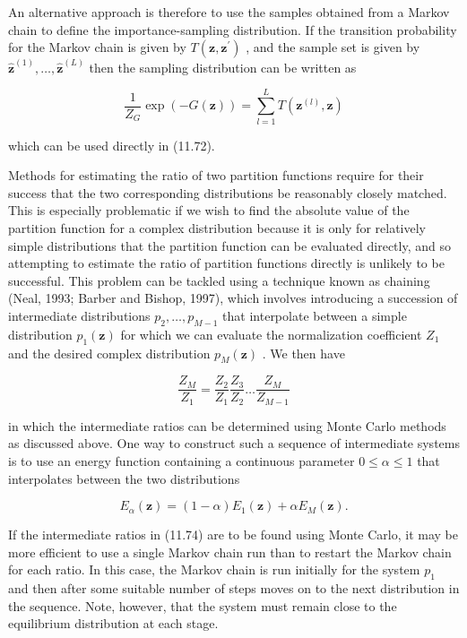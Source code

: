 \documentclass[
  10
]{article}
\begin{document}
An alternative approach is therefore to use the samples obtained from a
Markov chain to define the importance-sampling distribution. If the
transition probability for the Markov chain is given by
\(T ( \mathbf { z } , \mathbf { z } ^ { \prime } )\) , and the sample
set is given by
\(\mathbf { \hat { z } } ^ { ( 1 ) } , \ldots , \mathbf { \hat { z } } ^ { ( L ) }\)
then the sampling distribution can be written as

\[
\frac {1}{Z _ {G}} \exp (- G (\mathbf {z})) = \sum_ {l = 1} ^ {L} T (\mathbf {z} ^ {(l)}, \mathbf {z})\tag{11.73}
\]

which can be used directly in (11.72).

Methods for estimating the ratio of two partition functions require for
their success that the two corresponding distributions be reasonably
closely matched. This is especially problematic if we wish to find the
absolute value of the partition function for a complex distribution
because it is only for relatively simple distributions that the
partition function can be evaluated directly, and so attempting to
estimate the ratio of partition functions directly is unlikely to be
successful. This problem can be tackled using a technique known as
chaining (Neal, 1993; Barber and Bishop, 1997), which involves
introducing a succession of intermediate distributions
\(p _ { 2 } , \ldots , p _ { M - 1 }\) that interpolate between a simple
distribution \(p _ { 1 } ( \mathbf { z } )\) for which we can evaluate
the normalization coefficient \(Z _ { 1 }\) and the desired complex
distribution \(p _ { M } ( \mathbf { z } )\) . We then have

\[
\frac {Z _ {M}}{Z _ {1}} = \frac {Z _ {2}}{Z _ {1}} \frac {Z _ {3}}{Z _ {2}} \dots \frac {Z _ {M}}{Z _ {M - 1}}\tag{11.74}
\]

in which the intermediate ratios can be determined using Monte Carlo
methods as discussed above. One way to construct such a sequence of
intermediate systems is to use an energy function containing a
continuous parameter \(0 \leqslant \alpha \leqslant 1\) that
interpolates between the two distributions

\[
E _ {\alpha} (\mathbf {z}) = (1 - \alpha) E _ {1} (\mathbf {z}) + \alpha E _ {M} (\mathbf {z}).\tag{11.75}
\]

If the intermediate ratios in (11.74) are to be found using Monte Carlo,
it may be more efficient to use a single Markov chain run than to
restart the Markov chain for each ratio. In this case, the Markov chain
is run initially for the system \(p _ { 1 }\) and then after some
suitable number of steps moves on to the next distribution in the
sequence. Note, however, that the system must remain close to the
equilibrium distribution at each stage.
\end{document}
